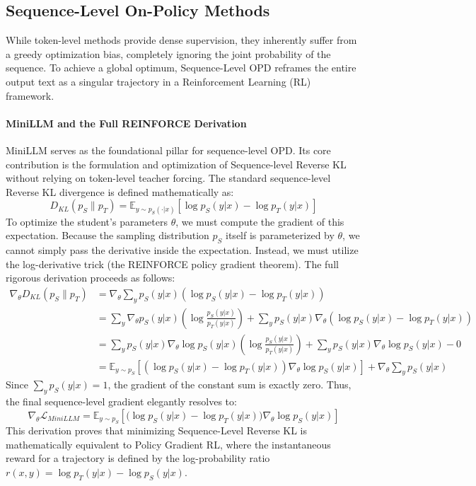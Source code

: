 \documentclass{article} %
\begin{document}
\subsection{Sequence-Level On-Policy Methods}
\label{subsec:sequence_level}

While token-level methods provide dense supervision, they inherently suffer from a greedy optimization bias, completely ignoring the joint probability of the sequence. To achieve a global optimum, Sequence-Level OPD reframes the entire output text as a singular trajectory in a Reinforcement Learning (RL) framework.

\paragraph{MiniLLM and the Full REINFORCE Derivation}
MiniLLM \citep{2306.08543} serves as the foundational pillar for sequence-level OPD. Its core contribution is the formulation and optimization of Sequence-level Reverse KL without relying on token-level teacher forcing.
The standard sequence-level Reverse KL divergence is defined mathematically as:
\begin{equation}
    D_{KL}(p_S \parallel p_T) = \mathbb{E}_{y \sim p_S(\cdot|x)} \left[ \log p_S(y|x) - \log p_T(y|x) \right]
\end{equation}
To optimize the student's parameters $\theta$, we must compute the gradient of this expectation. Because the sampling distribution $p_S$ itself is parameterized by $\theta$, we cannot simply pass the derivative inside the expectation. Instead, we must utilize the log-derivative trick (the REINFORCE policy gradient theorem). The full rigorous derivation proceeds as follows:
\begin{align}
    \nabla_\theta D_{KL}(p_S \parallel p_T) &= \nabla_\theta \sum_y p_S(y|x) \left( \log p_S(y|x) - \log p_T(y|x) \right) \nonumber \\
    &= \sum_y \nabla_\theta p_S(y|x) \left( \log \frac{p_S(y|x)}{p_T(y|x)} \right) + \sum_y p_S(y|x) \nabla_\theta \left( \log p_S(y|x) - \log p_T(y|x) \right) \nonumber \\
    &= \sum_y p_S(y|x) \nabla_\theta \log p_S(y|x) \left( \log \frac{p_S(y|x)}{p_T(y|x)} \right) + \sum_y p_S(y|x) \nabla_\theta \log p_S(y|x) - 0 \nonumber \\
    &= \mathbb{E}_{y \sim p_S} \left[ \left( \log p_S(y|x) - \log p_T(y|x) \right) \nabla_\theta \log p_S(y|x) \right] + \nabla_\theta \sum_y p_S(y|x)
\end{align}
Since $\sum_y p_S(y|x) = 1$, the gradient of the constant sum is exactly zero. Thus, the final sequence-level gradient elegantly resolves to:
\begin{equation}
    \nabla_\theta \mathcal{L}_{MiniLLM} = \mathbb{E}_{y \sim p_S} \left[ \Big( \log p_S(y|x) - \log p_T(y|x) \Big) \nabla_\theta \log p_S(y|x) \right]
    \label{eq:minillm_final}
\end{equation}
This derivation proves that minimizing Sequence-Level Reverse KL is mathematically equivalent to Policy Gradient RL, where the instantaneous reward for a trajectory is defined by the log-probability ratio $r(x, y) = \log p_T(y|x) - \log p_S(y|x)$.
\end{document}
